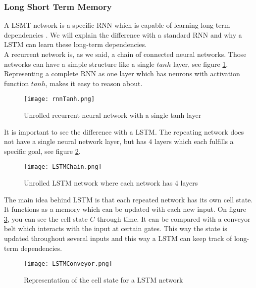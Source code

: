 \subsubsection{Long Short Term Memory}
\label{sec:lstm}

A LSMT network is a specific RNN which is capable of learning long-term dependencies \cite{lstmDep:thesis}. We will explain the difference with a standard RNN and why a LSTM can learn these long-term dependencies. \\

A recurrent network is, as we said, a chain of connected neural networks. Those networks can have a simple structure like a single $tanh$ layer, see figure \ref{fig:rnnTanh}. Representing a complete RNN as one layer which has neurons with activation function $tanh$, makes it easy to reason about. \\

\begin{figure}[!htb]
	\centering
	\texttt{[image: rnnTanh.png]}
	\caption{Unrolled recurrent neural network with a single tanh layer \cite{lstmGood:online}}
	\label{fig:rnnTanh}
\end{figure} 

It is important to see the difference with a LSTM. The repeating network does not have a single neural network layer, but has $4$ layers which each fulfills a specific goal, see figure \ref{fig:LSTMChain}.\\

\begin{figure}[!htb]
	\centering
	\texttt{[image: LSTMChain.png]}
	\caption{Unrolled LSTM network where each network has 4 layers \cite{lstmGood:online}}
	\label{fig:LSTMChain}
\end{figure} 

The main idea behind LSTM is that each repeated network has its own cell state. It functions as a memory which can be updated with each new input. On figure \ref{fig:LSTMConveyor}, you can see the cell state $C$ through time. It can be compared with a conveyor belt which interacts with the input at certain gates. This way the state is updated throughout several inputs and this way a LSTM can keep track of long-term dependencies. \\

\begin{figure}[!htb]
	\centering
	\texttt{[image: LSTMConveyor.png]}
	\caption{Representation of the cell state for a LSTM network \cite{lstmGood:online}}
	\label{fig:LSTMConveyor}
\end{figure} 

